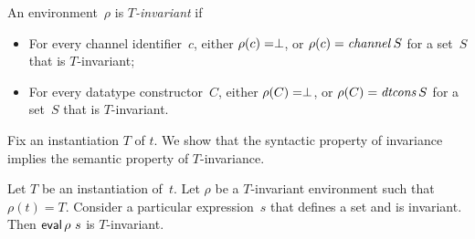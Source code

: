 \begin{definition}
An environment~$\rho$ is \emph{$T$-invariant} if
\begin{itemize}
\item For every channel identifier~$c$, either $\rho(c) = \perp$, or
  $\rho(c) = \mathop{\it channel} S$ for a set~$S$ that is $T$-invariant;

\item For every datatype constructor~$C$, either $\rho(C) = \perp$, or
  $\rho(C) = \mathop{\it dtcons} S$ for a set~$S$ that is $T$-invariant.
\end{itemize}
\end{definition}


Fix an instantiation $T$ of $t$.  We show that the syntactic property of
invariance implies the semantic property of $T$-invariance. 

\begin{lemma}
\label{lem:invariant}
Let $T$ be an instantiation of~$t$.  Let $\rho$ be a $T$-invariant environment
such that $\rho(t) = T$. 
%
Consider a particular expression~$s$ that defines a set and is invariant.
Then $\mathop{\sf eval} \rho~s$ is $T$-invariant.
\end{lemma}

